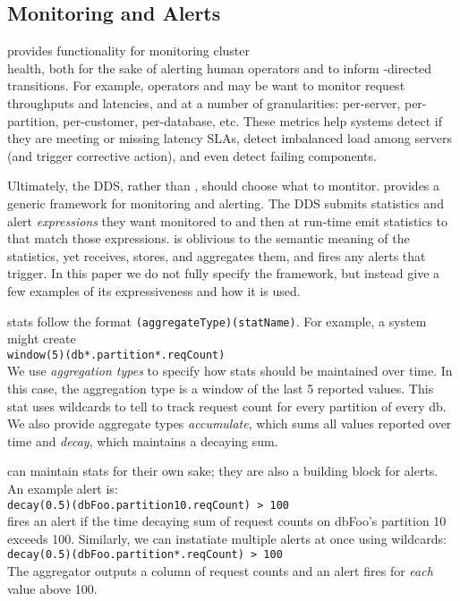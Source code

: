 \subsection{Monitoring and Alerts}
\label{alerts}
%
\helix provides functionality for monitoring cluster \\ health, both for the sake
of alerting human operators and to inform \helix-directed transitions.  
For example, operators and \helix may be want to monitor request throughputs and 
latencies, and at a number of granularities: per-server, per-partition, 
per-customer, per-database, etc.  These metrics help systems detect if they are 
meeting or missing latency SLAs, detect imbalanced load among servers 
(and trigger corrective action), and even detect failing components.  

Ultimately, the DDS, rather than \helix, should choose what to montitor.  \helix
provides a generic framework for monitoring and alerting.  The DDS submits
statistics and alert \emph{expressions} they want monitored to \helix and then
at run-time emit statistics to \helix that match those expressions.  \helix is
oblivious to the semantic meaning of the statistics, yet receives, stores, and
aggregates them, and fires any alerts that trigger.  In this paper we do not
fully specify the framework, but instead give a few examples of its
expressiveness and how it is used.

\helix stats follow the format
\texttt{(aggregateType)(statName)}.
For example, a system might create \\
\texttt{window(5)(db*.partition*.reqCount)} \\
We use \emph{aggregation types} to specify how stats should be maintained over time.  
In this case, the aggregation type is a window of the last 5 reported values.
This stat uses wildcards to tell \helix to track request count for every partition of 
every db.  We also provide aggregate types \emph{accumulate}, which sums all values 
reported over time and \emph{decay}, which maintains a decaying sum.

\helix can maintain stats for their own sake; they are also a building block for
alerts.  An example alert is: \\
\texttt{decay(0.5)(dbFoo.partition10.reqCount) > 100} \\
\helix fires an alert if the time decaying sum of request counts on 
dbFoo's partition 10 exceeds 100.  Similarly, we can instatiate multiple
alerts at once using wildcards: \\
\texttt{decay(0.5)(dbFoo.partition*.reqCount) > 100} \\
The aggregator outputs a column of request counts and an alert fires 
for \emph{each} value
above 100. 

